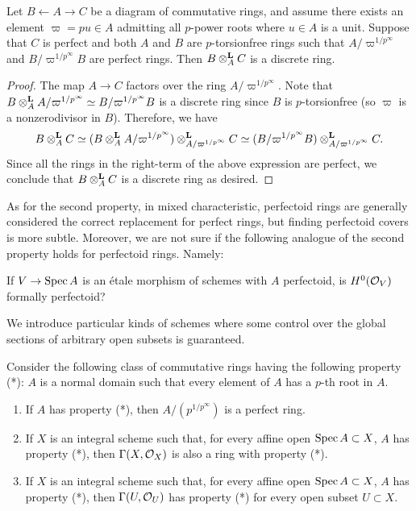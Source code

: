 \begin{proposition}\label{prop:torindep}
Let $B \leftarrow A \to C$ be a diagram of commutative rings, and assume there exists an element $\varpi=pu \in A$ admitting all $p$-power roots where $u \in A$ is a unit. 
Suppose that $C$ is perfect and both $A$ and $B$ are $p$-torsionfree rings such that $A/\varpi^{1/p^{\infty}}$ and $B/\varpi^{1/p^{\infty}}B$ are perfect rings. 
Then $B \otimesl_A C$ is a discrete ring.
\end{proposition}
\begin{proof}
The map $A \to C$ factors over the ring $A/\varpi^{1/p^{\infty}}$.
Note that $B \otimesl_{A} A/\varpi^{1/p^{\infty}} \simeq B/\varpi^{1/p^{\infty}}B$ is a discrete ring since $B$ is $p$-torsionfree (so $\varpi$ is a nonzerodivisor in $B$). Therefore, we have
\[B \otimesl_A C \simeq (B \otimesl_A A/\varpi^{1/p^{\infty}}) \otimesl_{A/\varpi^{1/p^{\infty}}} C \simeq (B/\varpi^{1/p^{\infty}}B) \otimesl_{A/\varpi^{1/p^{\infty}}} C.\]
Since all the rings in the right-term of the above expression are perfect, we conclude that $B \otimesl_A C$ is a discrete ring as desired.
\end{proof}
As for the second property, in mixed characteristic, perfectoid rings are generally considered the correct replacement for perfect rings, 
but finding perfectoid covers is more subtle. Moreover, we
are not sure if the following analogue of the second property holds for perfectoid rings. Namely:
\begin{question}
If $V \to \spec{A}$ is an \'{e}tale morphism of schemes with $A$ perfectoid, is $H^0(\cal{O}_V)$ formally perfectoid?
\end{question}
We introduce particular kinds of schemes where some control over the global sections of arbitrary open subsets is guaranteed.
\begin{proposition}\label{prop:perfglobalsections}
Consider the following class of commutative rings having the following property (*): $A$ is a normal domain such that every element of $A$ has a $p$-th root in $A$.
\begin{enumerate}
\item[(i)] If $A$ has property (*), then $A/(p^{1/p^{\infty}})$ is a perfect ring.
\item[(ii)] If $X$ is an integral scheme such that, for every affine open $\spec{A} \subset X$, $A$ has property (*), then $\Gamma(X, \cal{O}_X)$ is also a ring with property (*).
\item[(iii)] If $X$ is an integral scheme such that, for every affine open $\spec{A} \subset X$, $A$ has property (*), then $\Gamma(U, \cal{O}_U)$ has property (*) for every open subset $U \subset X$.
\end{enumerate}
\end{proposition}
